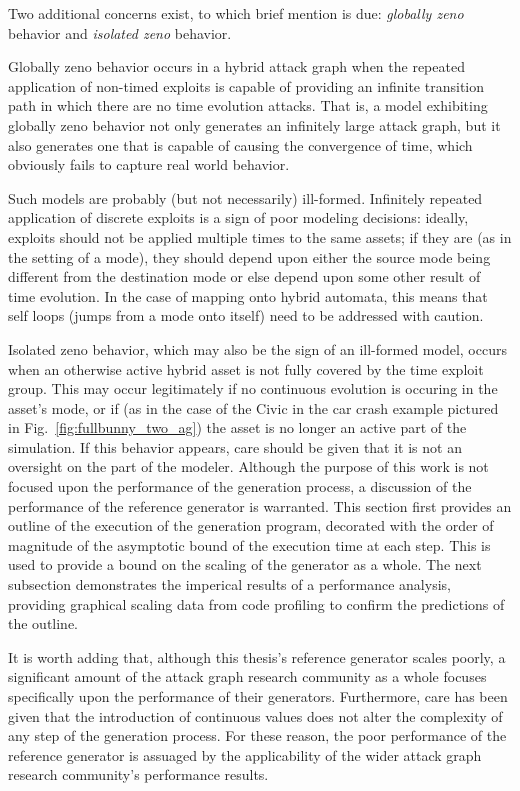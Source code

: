 Two additional concerns exist, to which brief mention is due: \emph{globally 
zeno} behavior and \emph{isolated zeno} behavior.

Globally zeno behavior occurs in a hybrid attack graph when the
repeated application of non-timed exploits is capable of providing an infinite
transition path in which there are no time 
evolution attacks. That is, a model exhibiting globally zeno behavior not only
generates an infinitely large attack graph, but it also generates one that is
capable of causing the convergence of time, which obviously fails to
capture real world behavior.

Such models are probably (but
not necessarily) ill-formed. Infinitely repeated application of discrete
exploits is a sign of poor modeling decisions: ideally, exploits should not be
applied multiple times to the same assets; if they are (as in the setting of a
mode), they should depend upon either the source mode being different from the
destination mode or else depend upon some other result of time evolution. In the
case of mapping onto hybrid automata, this means that self loops (jumps from a
mode onto itself) need to be addressed with caution.

Isolated zeno behavior, which may also be the sign of an ill-formed model, 
occurs when an otherwise active hybrid asset is not fully covered by the time
exploit group. This may occur legitimately if no continuous evolution is
occuring in the asset's mode, or if (as in the case of the Civic in the
car crash example pictured in Fig.~\ref{fig:fullbunny_two_ag}) the asset is
no longer an active part of the simulation. If this behavior appears, care 
should be given that it is not an oversight on the part of the modeler.
Although the purpose of this work is not focused upon the performance of the
generation process, a discussion of the performance of the reference
generator is warranted. This section first
provides an outline of the execution of the generation program, decorated with
the order of magnitude of the asymptotic bound of the execution time at
each step. This is used to provide a bound on the scaling of the generator as
a whole. The next subsection demonstrates the imperical results of a performance
analysis, providing graphical scaling data from code profiling
to confirm the predictions of the outline.

It is worth adding that, although this thesis's reference generator scales 
poorly, a significant amount of the attack graph research community as a whole
focuses specifically upon the performance of their generators. Furthermore, care
has been given that the introduction of continuous values does not alter the
complexity of any step of the generation process. For these reason,
the poor performance of the reference generator is assuaged by the applicability
of the wider attack graph research community's performance results.

